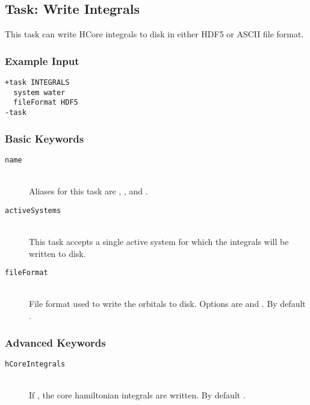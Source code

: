 \subsection{Task: Write Integrals}
This task can write HCore integrals to disk in either HDF5 or ASCII file format.
\subsubsection{Example Input}
\begin{lstlisting}
+task INTEGRALS
  system water
  fileFormat HDF5
-task
\end{lstlisting}

\subsubsection{Basic Keywords}
\begin{description}
    \item [\texttt{name}]\hfill \\
    Aliases for this task are , ,  and .
    \item [\texttt{activeSystems}]\hfill \\
    This task accepts a single active system for which the integrals will be written to disk.
    \item [\texttt{fileFormat}]\hfill \\
    File format used to write the orbitals to disk. Options are  and . By default .
\end{description}
    
\subsubsection{Advanced Keywords}
\begin{description}
    \item [\texttt{hCoreIntegrals}]\hfill \\
    If , the core hamiltonian integrals are written. By default .
\end{description}
